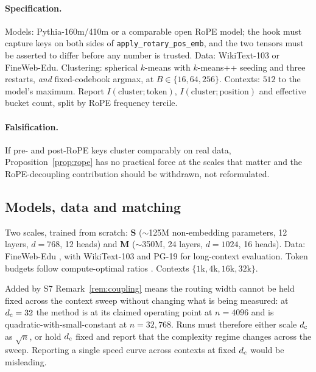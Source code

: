 \paragraph{Specification.} Models: Pythia-160m/410m or a comparable open RoPE model; the hook must capture keys on both sides of \texttt{apply\_rotary\_pos\_emb}, and the two tensors must be asserted to differ before any number is trusted. Data: WikiText-103 or FineWeb-Edu. Clustering: spherical $k$-means with $k$-means++ seeding and three restarts, \emph{and} fixed-codebook argmax, at $B \in \{16, 64, 256\}$. Contexts: $512$ to the model's maximum. Report $I(\text{cluster};\text{token})$, $I(\text{cluster};\text{position})$ and effective bucket count, split by RoPE frequency tercile.

\paragraph{Falsification.} If pre- and post-RoPE keys cluster comparably on real data, Proposition~\ref{prop:rope} has no practical force at the scales that matter and the RoPE-decoupling contribution should be withdrawn, not reformulated.

\subsection{Models, data and matching}

Two scales, trained from scratch: \textbf{S} ($\sim$125M non-embedding parameters, 12 layers, $d=768$, 12 heads) and \textbf{M} ($\sim$350M, 24 layers, $d=1024$, 16 heads). Data: FineWeb-Edu \citep{penedo2024fineweb}, with WikiText-103 \citep{merity2017pointer} and PG-19 \citep{rae2020compressive} for long-context evaluation. Token budgets follow compute-optimal ratios \citep{hoffmann2022chinchilla}. Contexts $\{1\text{k}, 4\text{k}, 16\text{k}, 32\text{k}\}$.

\begin{revision}{Added by S7}
Remark~\ref{rem:coupling} means the routing width cannot be held fixed across the context sweep without changing what is being measured: at $d_{\mathrm{c}} = 32$ the method is at its claimed operating point at $n = 4096$ and is quadratic-with-small-constant at $n = 32{,}768$. Runs must therefore either scale $d_{\mathrm{c}}$ as $\sqrt{n}$, or hold $d_{\mathrm{c}}$ fixed and report that the complexity regime changes across the sweep. Reporting a single speed curve across contexts at fixed $d_{\mathrm{c}}$ would be misleading.
\end{revision}

